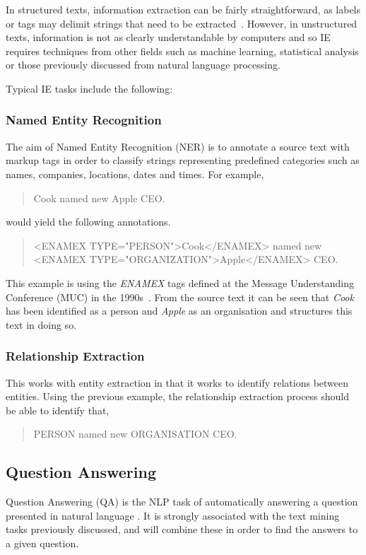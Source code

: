 In structured texts, information extraction can be fairly straightforward, as labels or tags may delimit strings that need to be extracted~\cite{soderland99}. However, in unstructured texts, information is not as clearly understandable by computers and so IE requires techniques from other fields such as machine learning, statistical analysis or those previously discussed from natural language processing.

Typical IE tasks include the following:

\subsubsection{Named Entity Recognition}
The aim of Named Entity Recognition (NER) is to annotate a source text with markup tags in order to classify strings representing predefined categories such as names, companies, locations, dates and times. For example,
\begin{quote}
Cook named new Apple CEO.
\end{quote}
would yield the following annotations.
\begin{quote}
<ENAMEX TYPE="PERSON">Cook</ENAMEX> named new
\newline
<ENAMEX TYPE="ORGANIZATION">Apple</ENAMEX> CEO.
\end{quote}

This example is using the \emph{ENAMEX} tags defined at the Message Understanding Conference (MUC) in the 1990s~\cite{grishman96muc}. From the source text it can be seen that \emph{Cook} has been identified as a person and \emph{Apple} as an organisation and structures this text in doing so.

\subsubsection{Relationship Extraction}
This works with entity extraction in that it works to identify relations between entities. Using the previous example, the relationship extraction process should be able to identify that,
\begin{quote}
PERSON named new ORGANISATION CEO.
\end{quote}


\subsection{Question Answering}
Question Answering (QA) is the NLP task of automatically answering a question presented in natural language \cite{qa01}. It is strongly associated with the text mining tasks previously discussed, and will combine these in order to find the answers to a given question.

